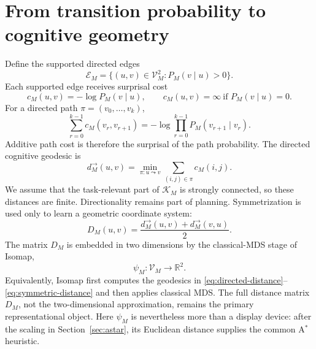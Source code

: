 \documentclass[11pt]{article}
\begin{document}
\section{From transition probability to cognitive geometry}
\label{sec:geometry}

Define the supported directed edges
\[
\mathcal E_M
=
\{(u,v)\in\mathcal V_M^2:P_M(v\mid u)>0\}.
\]
Each supported edge receives surprisal cost
\begin{equation}
c_M(u,v)
=
-\log P_M(v\mid u),
\qquad
c_M(u,v)=\infty
\ \text{if }P_M(v\mid u)=0.
\label{eq:surprisal}
\end{equation}
For a directed path $\pi=(v_0,\ldots,v_k)$,
\[
\sum_{r=0}^{k-1}c_M(v_r,v_{r+1})
=
-\log\prod_{r=0}^{k-1}P_M(v_{r+1}\mid v_r).
\]
Additive path cost is therefore the surprisal of the path probability. The directed
cognitive geodesic is
\begin{equation}
d_M^\to(u,v)
=
\min_{\pi:u\leadsto v}
\sum_{(i,j)\in\pi}c_M(i,j).
\label{eq:directed-distance}
\end{equation}
We assume that the task-relevant part of $\mathcal K_M$ is strongly connected, so these
distances are finite. Directionality remains part of planning. Symmetrization is used only
to learn a geometric coordinate system:
\begin{equation}
D_M(u,v)
=
\frac{d_M^\to(u,v)+d_M^\to(v,u)}{2}.
\label{eq:symmetric-distance}
\end{equation}
The matrix $D_M$ is embedded in two dimensions by the classical-MDS stage of Isomap,
\begin{equation}
\psi_M:\mathcal V_M\longrightarrow\mathbb R^2.
\label{eq:embedding}
\end{equation}
Equivalently, Isomap first computes the geodesics in
\eqref{eq:directed-distance}--\eqref{eq:symmetric-distance} and then applies classical MDS.
The full distance matrix $D_M$, not the two-dimensional approximation, remains the primary
representational object. Here $\psi_M$ is nevertheless more than a display device: after
the scaling in Section~\ref{sec:astar}, its Euclidean distance supplies the common A$^\ast$
heuristic.
\end{document}
